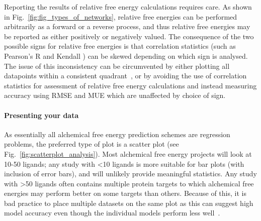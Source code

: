 \documentclass[9pt,bestpractices]{livecoms}
\begin{document}
Reporting the results of relative free energy calculations requires care. As shown in Fig.~\ref{fig:fig_types_of_networks}, relative free energies can be performed arbitrarily as a forward or a reverse process, and thus relative free energies may be reported as either positively or negatively valued. The consequence of the two possible signs for relative free energies is that correlation statistics (such as Pearson's R and Kendall \texttau{}) can be skewed depending on which sign is analysed. The issue of this inconsistency can be circumvented by either plotting all datapoints within a consistent quadrant~\cite{perez-benito2019predicting}, or by avoiding the use of correlation statistics for assessment of relative free energy calculations and instead measuring accuracy using RMSE and MUE which are unaffected by choice of sign.


\paragraph{Presenting your data}
As essentially all alchemical free energy prediction schemes are regression problems, the preferred type of plot is a scatter plot (see Fig.~\ref{fig:scatterplot_analysis}). Most alchemical free energy projects will look at 10-50 ligands; any study with \textless10 ligands is more suitable for bar plots (with inclusion of error bars), and will unlikely provide meaningful statistics. Any study with \textgreater50 ligands often contains multiple protein targets to which alchemical free energies may perform better on some targets than others. Because of this, it is bad practice to place multiple datasets on the same plot as this can suggest high model accuracy even though the individual models perform less well~\cite{walterthoughts}.
\end{document}
